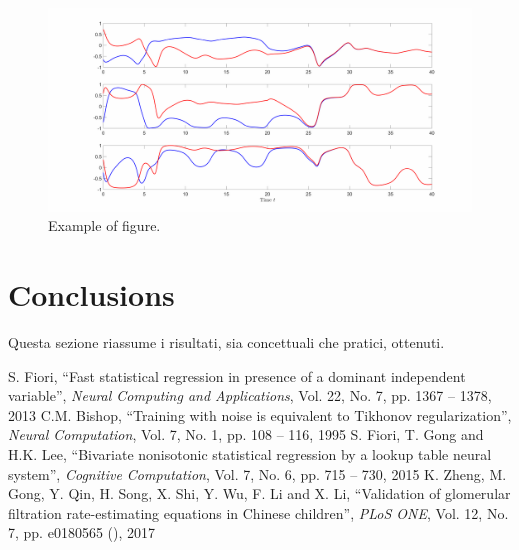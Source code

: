 \documentclass[10pt,final]{siamltex}
\begin{document}
\vspace{5mm}
%
\begin{figure}[h!]
  \centering
  \includegraphics[scale=0.3]{Experiment1a}
  \caption{Example of figure.}
  \label{bodyfat}
\end{figure}
%
%
\section{Conclusions}\label{sec4}
%
{{\red Questa sezione riassume i risultati, sia concettuali che pratici, ottenuti.}}
%
\begin{thebibliography}{99}
   S. Fiori, ``Fast statistical regression in presence of a dominant independent variable'', \textit{Neural Computing and Applications}, Vol. 22, No. 7, pp. 1367 -- 1378, 2013
   C.M. Bishop, ``Training with noise is equivalent to Tikhonov regularization'', \textit{Neural Computation}, Vol. 7, No. 1, pp. 108 -- 116, 1995
   S. Fiori, T. Gong and H.K. Lee, ``Bivariate nonisotonic statistical regression by a lookup table neural system'', \textit{Cognitive Computation}, Vol. 7, No. 6, pp. 715 -- 730, 2015
   K. Zheng, M. Gong, Y. Qin, H. Song, X. Shi, Y. Wu, F. Li and X. Li, ``Validation of glomerular filtration rate-estimating equations in Chinese children'', \textit{PLoS ONE}, Vol. 12, No. 7, pp. e0180565 (), 2017
\end{thebibliography}
\end{document}
